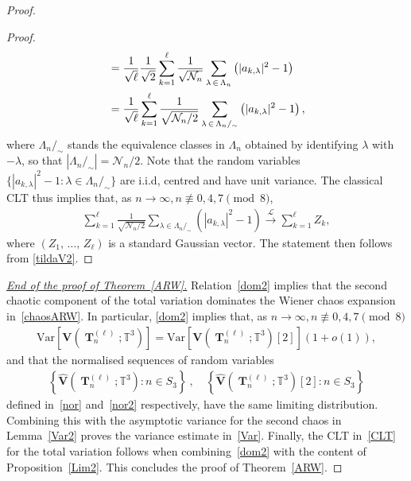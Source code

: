 \documentclass[10pt]{amsart}
\theoremstyle{definition}\newtheorem{defi}[theo]{Definition}\newtheorem{rema}[theo]{Remark}\newtheorem{exam}[theo]{Example}\newtheorem{exem}[theo]{Example}\newtheorem{nota}[theo]{Notation}
\DeclareMathOperator{\bT}{\mathbf{T}}
\newcommand{\bfv}{\mathbf{V}}
\newcommand{\T}{\mathbb{T}^3}
\newcommand{\V}[1]{\mathrm{Var}{\left[#1\right]}}
\newcommand{\Law}{\xrightarrow[]{\mathcal{L}} }
\newcommand{\notcon}[3]{ {#1} \not\equiv {#2} \pmod {#3} }
\newcommand{\Nn}{\mathcal{N}_n}
\begin{document}
\begin{proof}
\begin{proof}
\begin{equation}
\begin{split}
&=
\frac{1}{\sqrt{\ell}}
\frac{1}{\sqrt{2}}\sum_{k=1}^{\ell} \frac{1}{\sqrt{\Nn}}\sum_{\lambda \,\in\,\Lambda_n}\left(|a_{k,\lambda}|^2-1\right) \notag \\
&= \frac{1}{\sqrt{\ell}} \sum_{k=1}^{\ell}
\frac{1}{\sqrt{\Nn/2}}\sum_{\lambda\,\in\,\Lambda_n/_{\sim}}\left(|a_{k,\lambda}|^2-1\right),
\end{split}
\end{equation}
where $\Lambda_n/_{\sim}$ stands the equivalence classes in $\Lambda_n$ obtained by identifying $\lambda$ with $-\lambda$, so that $|\Lambda_n/_{\sim}|=\Nn/2$. Note that the random variables $\{ |a_{k,\lambda}|^2-1: \lambda\in \Lambda_n/_{\sim}\}$ are i.i.d, centred and have unit variance. The classical CLT thus implies that, as $n \to \infty, \notcon{n}{0,4,7}{8}$,
\begin{gather*}
\sum_{k=1}^{\ell}
\frac{1}{\sqrt{\Nn/2}}\sum_{\lambda\in \Lambda_n/_{\sim}}(|a_{k,\lambda}|^2-1) \Law \sum_{k=1}^{\ell}Z_k,
\end{gather*}
where $(Z_1,\,\ldots,\,Z_{\ell})$ is a standard Gaussian vector. The statement then follows from \eqref{tildaV2}.
\end{proof}


\noindent\underline{\emph{End of the proof of Theorem~\ref{ARW}.}} Relation~\eqref{dom2} implies that the second chaotic component of the total variation dominates the Wiener chaos expansion in~\eqref{chaosARW}. In particular, \eqref{dom2} implies that, as $n \to \infty, \notcon{n}{0,4,7}{8}$
\begin{gather*}
\V{\bfv\left(\bT_n^{(\ell)};\T\right)} =
\V{\bfv\left(\bT_n^{(\ell)};\T\right)[2]}(1+o(1)),
\end{gather*}
and that the normalised sequences of random variables
\begin{gather*}
\left\{\widehat{\bfv}\left(\bT_n^{(\ell)};\T\right) : n \in S_3\right\} \ , \quad
\left\{\widehat{\bfv}\left(\bT_n^{(\ell)};\T\right)[2] : n \in S_3\right\}
\end{gather*}
defined in~\eqref{nor} and~\eqref{nor2} respectively, have the same limiting distribution. Combining this with the asymptotic variance for the second chaos in Lemma~\ref{Var2} proves the variance estimate in~\eqref{Var}. Finally, the CLT in~\eqref{CLT} for the total variation follows when combining~\eqref{dom2} with the content of Proposition~\ref{Lim2}. This concludes the proof of Theorem~\ref{ARW}.
\end{proof}


\appendix
\end{document}
